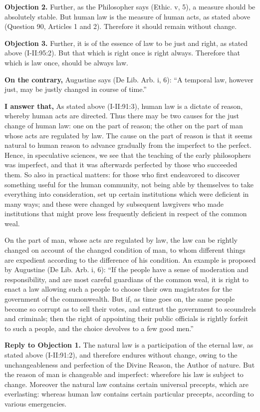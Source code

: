 \textbf{Objection 2.} Further, as the Philosopher says (Ethic. v, 5), a measure should be absolutely stable. But human law is the measure of human acts, as stated above (Question 90, Articles 1 and 2). Therefore it should remain without change.

\textbf{Objection 3.} Further, it is of the essence of law to be just and right, as stated above (I-II:95:2). But that which is right once is right always. Therefore that which is law once, should be always law.

\textbf{On the contrary,} Augustine says (De Lib. Arb. i, 6): ``A temporal law, however just, may be justly changed in course of time.''

\textbf{I answer that,} As stated above (I-II:91:3), human law is a dictate of reason, whereby human acts are directed. Thus there may be two causes for the just change of human law: one on the part of reason; the other on the part of man whose acts are regulated by law. The cause on the part of reason is that it seems natural to human reason to advance gradually from the imperfect to the perfect. Hence, in speculative sciences, we see that the teaching of the early philosophers was imperfect, and that it was afterwards perfected by those who succeeded them. So also in practical matters: for those who first endeavored to discover something useful for the human community, not being able by themselves to take everything into consideration, set up certain institutions which were deficient in many ways; and these were changed by subsequent lawgivers who made institutions that might prove less frequently deficient in respect of the common weal.

On the part of man, whose acts are regulated by law, the law can be rightly changed on account of the changed condition of man, to whom different things are expedient according to the difference of his condition. An example is proposed by Augustine (De Lib. Arb. i, 6): ``If the people have a sense of moderation and responsibility, and are most careful guardians of the common weal, it is right to enact a law allowing such a people to choose their own magistrates for the government of the commonwealth. But if, as time goes on, the same people become so corrupt as to sell their votes, and entrust the government to scoundrels and criminals; then the right of appointing their public officials is rightly forfeit to such a people, and the choice devolves to a few good men.''

\textbf{Reply to Objection 1.} The natural law is a participation of the eternal law, as stated above (I-II:91:2), and therefore endures without change, owing to the unchangeableness and perfection of the Divine Reason, the Author of nature. But the reason of man is changeable and imperfect: wherefore his law is subject to change. Moreover the natural law contains certain universal precepts, which are everlasting: whereas human law contains certain particular precepts, according to various emergencies.

